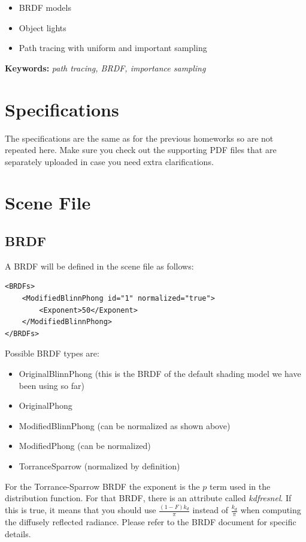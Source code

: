 \documentclass[12pt]{article}
\begin{document}
\begin{itemize}
    \item BRDF models
    \item Object lights
    \item Path tracing with uniform and important sampling
\end{itemize}

\vspace{0.5cm} \noindent \textbf{Keywords:} \emph{path tracing, BRDF,
    importance sampling}

\section{Specifications}

The specifications are the same as for the previous homeworks so are not
repeated here. Make sure you check out the supporting PDF files that are
separately uploaded in case you need extra clarifications.

\section{Scene File}
\label{sec:sceneFile}

\subsection{BRDF}

A BRDF will be defined in the scene file as follows:

\begin{verbatim}
<BRDFs>
    <ModifiedBlinnPhong id="1" normalized="true">
        <Exponent>50</Exponent>
    </ModifiedBlinnPhong>
</BRDFs>
\end{verbatim}

Possible BRDF types are:
%
\begin{itemize}
\item OriginalBlinnPhong (this is the BRDF of the default shading model we have been using so far)
\item OriginalPhong
\item ModifiedBlinnPhong (can be normalized as shown above)
\item ModifiedPhong (can be normalized)
\item TorranceSparrow (normalized by definition)
\end{itemize}
%
For the Torrance-Sparrow BRDF the exponent is the $p$ term used in the
distribution function. For that BRDF, there is an attribute called
\emph{kdfresnel}. If this is true, it means that you should use
$\frac{(1 - F)k_d}{\pi}$ instead of $\frac{k_d}{\pi}$ when computing the
diffusely reflected radiance.  Please refer to the BRDF document for specific
details.
\end{document}
